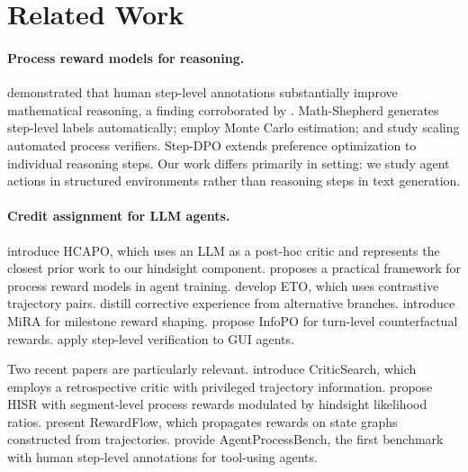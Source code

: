 \documentclass[11pt]{article}
\begin{document}
\section{Related Work}
\label{sec:related}

\paragraph{Process reward models for reasoning.}
\citet{lightman2023lets} demonstrated that human step-level annotations substantially improve mathematical reasoning, a finding corroborated by \citet{uesato2022solving}. Math-Shepherd \citep{wang2024math} generates step-level labels automatically; \citet{luo2024improve} employ Monte Carlo estimation; and \citet{setlur2024rewarding} study scaling automated process verifiers. Step-DPO \citep{lai2024step} extends preference optimization to individual reasoning steps. Our work differs primarily in setting: we study agent actions in structured environments rather than reasoning steps in text generation.

\paragraph{Credit assignment for LLM agents.}
\citet{tan2026hindsight} introduce HCAPO, which uses an LLM as a post-hoc critic and represents the closest prior work to our hindsight component. \citet{choudhury2025process} proposes a practical framework for process reward models in agent training. \citet{song2024trial} develop ETO, which uses contrastive trajectory pairs. \citet{ge2026leafe} distill corrective experience from alternative branches. \citet{wang2026mira} introduce MiRA for milestone reward shaping. \citet{kong2026infopo} propose InfoPO for turn-level counterfactual rewards. \citet{chen2025gui} apply step-level verification to GUI agents.

Two recent papers are particularly relevant. \citet{zhang2025criticsearch} introduce CriticSearch, which employs a retrospective critic with privileged trajectory information. \citet{lu2026hisr} propose HISR with segment-level process rewards modulated by hindsight likelihood ratios. \citet{feng2026rewardflow} present RewardFlow, which propagates rewards on state graphs constructed from trajectories. \citet{fan2026agentprocessbench} provide AgentProcessBench, the first benchmark with human step-level annotations for tool-using agents.
\end{document}

